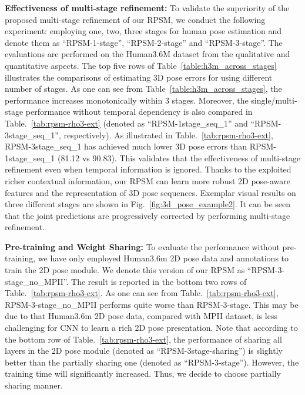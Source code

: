 \documentclass[10pt,twocolumn,letterpaper]{article}
\begin{document}
\textbf{Effectiveness of multi-stage refinement:} 
To validate the superiority of the proposed multi-stage refinement of our RPSM, we conduct the following experiment: employing one, two, three stages for human pose estimation and denote them as ``RPSM-1-stage'', ``RPSM-2-stage'' and ``RPSM-3-stage''. The evaluations are performed on the Human3.6M dataset from the qualitative and quantitative aspects. The top five rows of Table~\ref{table:h3m_across_stages} illustrates the comparisons of estimating 3D pose errors for using different number of stages. As one can see from Table~\ref{table:h3m_across_stages}, the performance increases monotonically within 3 stages. Moreover, the single/multi-stage performance without temporal dependency is also compared in Table.~\ref{tab:rpsm-rho3-ext} (denoted as ``RPSM-1stage\_seq\_1'' and ``RPSM-3stage\_seq\_1'', respectively). As illustrated in Table.~\ref{tab:rpsm-rho3-ext}, RPSM-3stage\_seq\_1 has achieved much lower 3D pose errors than RPSM-1stage\_seq\_1 (81.12 vs 90.83). This validates that the effectiveness of multi-stage refinement even when temporal information is ignored. Thanks to the exploited richer contextual information, our RPSM can learn more robust 2D pose-aware features and the representation of 3D pose sequences. Exemplar visual results on three different stages are shown in Fig.~\ref{fig:3d_pose_example2}. It can be seen that the joint predictions are progressively corrected by performing multi-stage refinement.


\textbf{Pre-training and Weight Sharing:}
To evaluate the performance without pre-training, we have only employed Human3.6m 2D pose data and annotations to train the 2D pose module. We denote this version of our RPSM as ``RPSM-3-stage\_no\_MPII''. The result is reported in the bottom two rows of Table.~\ref{tab:rpsm-rho3-ext}.  As one can see from Table.~\ref{tab:rpsm-rho3-ext}, RPSM-3-stage\_no\_MPII performs quite worse than RPSM-3-stage. This may be due to that Human3.6m 2D pose data, compared with MPII dataset, is less challenging for CNN to learn a rich 2D pose presentation. 
Note that according to the bottom row of Table.~\ref{tab:rpsm-rho3-ext}, the performance of sharing all layers in the 2D pose module (denoted as ``RPSM-3stage-sharing'') is slightly better than the partially sharing one (denoted as ``RPSM-3-stage''). However, the training time will significantly increased. Thus, we decide to choose partially sharing manner.
\end{document}
